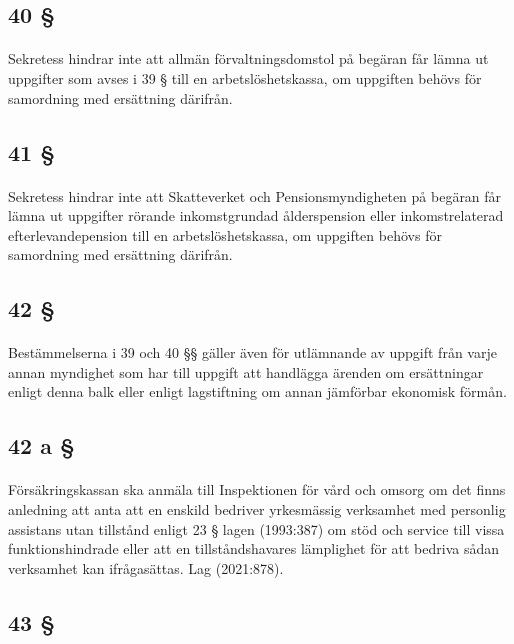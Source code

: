 \documentclass[a4paper,notitlepage,openany,10pt]{book}
\begin{document}
\subsection*{40 §}
\paragraph*{}
Sekretess hindrar inte att allmän förvaltningsdomstol på begäran får lämna ut uppgifter som avses i 39 § till en arbetslöshetskassa, om uppgiften behövs för samordning med ersättning därifrån.
\subsection*{41 §}
\paragraph*{}
Sekretess hindrar inte att Skatteverket och Pensionsmyndigheten på begäran får lämna ut uppgifter rörande inkomstgrundad ålderspension eller inkomstrelaterad efterlevandepension till en arbetslöshetskassa, om uppgiften behövs för samordning med ersättning därifrån.
\subsection*{42 §}
\paragraph*{}
Bestämmelserna i 39 och 40 §§ gäller även för utlämnande av uppgift från varje annan myndighet som har till uppgift att handlägga ärenden om ersättningar enligt denna balk eller enligt lagstiftning om annan jämförbar ekonomisk förmån.
\subsection*{42 a §}
\paragraph*{}
Försäkringskassan ska anmäla till Inspektionen för vård och omsorg om det finns anledning att anta att en enskild bedriver yrkesmässig verksamhet med personlig assistans utan tillstånd enligt 23 § lagen (1993:387) om stöd och service till vissa funktionshindrade eller att en tillståndshavares lämplighet för att bedriva sådan verksamhet kan ifrågasättas.
Lag (2021:878).
\subsection*{43 §}
\end{document}
